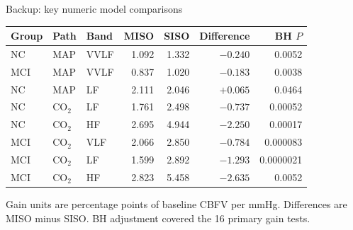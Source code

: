 \documentclass[aspectratio=169,11pt]{beamer}
\begin{document}
\begin{frame}{Backup: key numeric model comparisons}
    \scriptsize
    \centering
    \begin{tabular}{lllrrrr}
        \toprule
        Group & Path & Band & MISO & SISO & Difference & BH $P$ \\
        \midrule
        NC  & MAP & VVLF & 1.092 & 1.332 & $-0.240$ & 0.0052 \\
        MCI & MAP & VVLF & 0.837 & 1.020 & $-0.183$ & 0.0038 \\
        NC  & MAP & LF   & 2.111 & 2.046 & $+0.065$ & 0.0464 \\
        NC  & CO$_2$ & LF & 1.761 & 2.498 & $-0.737$ & 0.00052 \\
        NC  & CO$_2$ & HF & 2.695 & 4.944 & $-2.250$ & 0.00017 \\
        MCI & CO$_2$ & VLF & 2.066 & 2.850 & $-0.784$ & 0.000083 \\
        MCI & CO$_2$ & LF & 1.599 & 2.892 & $-1.293$ & 0.0000021 \\
        MCI & CO$_2$ & HF & 2.823 & 5.458 & $-2.635$ & 0.0052 \\
        \bottomrule
    \end{tabular}

    \vspace{0.45cm}
    Gain units are percentage points of baseline CBFV per mmHg. Differences
    are MISO minus SISO. BH adjustment covered the 16 primary gain tests.
\end{frame}
\end{document}
